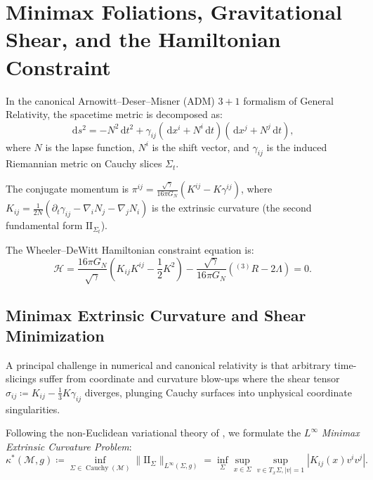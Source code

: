 \documentclass[11pt,a4paper,reqno]{amsart}
\theoremstyle{definition}
\numberwithin{equation}{section}
\newcommand{\II}{\mathrm{I\!I}}
\newcommand{\dif}{\,\mathrm{d}}
\begin{document}
\section{Minimax Foliations, Gravitational Shear, and the Hamiltonian Constraint}
\label{sec:minimax_adm}

In the canonical Arnowitt--Deser--Misner (ADM) $3+1$ formalism of General Relativity, the spacetime metric is decomposed as:
\begin{equation}
    \label{eq:adm_metric}
    \dif s^2 = -N^2 \dif t^2 + \gamma_{ij}(\dif x^i + N^i \dif t)(\dif x^j + N^j \dif t),
\end{equation}
where $N$ is the lapse function, $N^i$ is the shift vector, and $\gamma_{ij}$ is the induced Riemannian metric on Cauchy slices $\Sigma_t$.

The conjugate momentum is $\pi^{ij} = \frac{\sqrt{\gamma}}{16\pi G_N}(K^{ij} - K \gamma^{ij})$, where $K_{ij} = \frac{1}{2N}(\partial_t \gamma_{ij} - \nabla_i N_j - \nabla_j N_i)$ is the extrinsic curvature (the second fundamental form $\II_{\Sigma_t}$).

The Wheeler--DeWitt Hamiltonian constraint equation is:
\begin{equation}
    \label{eq:wdw_hamiltonian}
    \mathcal{H} = \frac{16\pi G_N}{\sqrt{\gamma}}\left( K_{ij} K^{ij} - \frac{1}{2} K^2 \right) - \frac{\sqrt{\gamma}}{16\pi G_N}\left( {}^{(3)}R - 2\Lambda \right) = 0.
\end{equation}

\subsection{Minimax Extrinsic Curvature and Shear Minimization}
A principal challenge in numerical and canonical relativity is that arbitrary time-slicings suffer from coordinate and curvature blow-ups where the shear tensor $\sigma_{ij} \coloneqq K_{ij} - \frac{1}{3} K \gamma_{ij}$ diverges, plunging Cauchy surfaces into unphysical coordinate singularities.

Following the non-Euclidean variational theory of \cite{monarch2026noneuclidean}, we formulate the $L^\infty$ \emph{Minimax Extrinsic Curvature Problem}:
\begin{equation}
    \label{eq:minimax_hypersurface_problem}
    \kappa^*(\mathcal{M}, g) \coloneqq \inf_{\Sigma \in \operatorname{Cauchy}(\mathcal{M})} \|\II_\Sigma\|_{L^\infty(\Sigma, g)} = \inf_\Sigma \sup_{x \in \Sigma} \sup_{v \in T_x \Sigma, |v|=1} |K_{ij}(x) v^i v^j|.
\end{equation}
\end{document}

